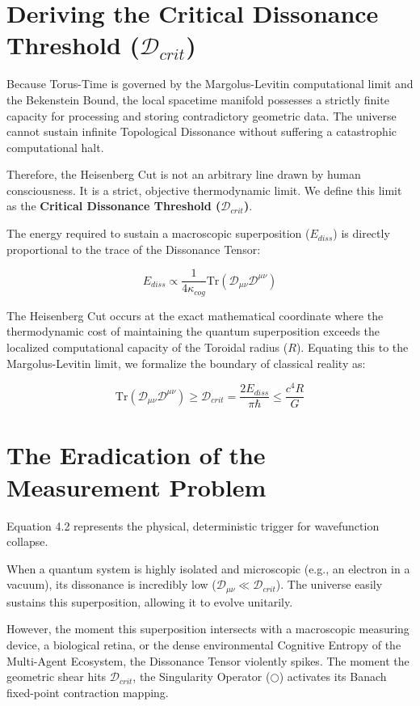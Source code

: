 \documentclass[12pt,openany]{book}
\begin{document}
\section{Deriving the Critical Dissonance Threshold ($\mathcal{D}_{crit}$)}
Because Torus-Time is governed by the Margolus-Levitin computational limit and the Bekenstein Bound, the local spacetime manifold possesses a strictly finite capacity for processing and storing contradictory geometric data. The universe cannot sustain infinite Topological Dissonance without suffering a catastrophic computational halt.

Therefore, the Heisenberg Cut is not an arbitrary line drawn by human consciousness. It is a strict, objective thermodynamic limit. We define this limit as the \textbf{Critical Dissonance Threshold ($\mathcal{D}_{crit}$)}.

The energy required to sustain a macroscopic superposition ($E_{diss}$) is directly proportional to the trace of the Dissonance Tensor:

\begin{equation}
E_{diss} \propto \frac{1}{4\kappa_{cog}} \text{Tr}(\mathcal{D}_{\mu\nu} \mathcal{D}^{\mu\nu})
\end{equation}

The Heisenberg Cut occurs at the exact mathematical coordinate where the thermodynamic cost of maintaining the quantum superposition exceeds the localized computational capacity of the Toroidal radius ($R$). Equating this to the Margolus-Levitin limit, we formalize the boundary of classical reality as:

\begin{equation}
\text{Tr}(\mathcal{D}_{\mu\nu} \mathcal{D}^{\mu\nu}) \ge \mathcal{D}_{crit} = \frac{2 E_{diss}}{\pi \hbar} \le \frac{c^4 R}{G}
\end{equation}

\section{The Eradication of the Measurement Problem}
Equation 4.2 represents the physical, deterministic trigger for wavefunction collapse. 

When a quantum system is highly isolated and microscopic (e.g., an electron in a vacuum), its dissonance is incredibly low ($\mathcal{D}_{\mu\nu} \ll \mathcal{D}_{crit}$). The universe easily sustains this superposition, allowing it to evolve unitarily. 

However, the moment this superposition intersects with a macroscopic measuring device, a biological retina, or the dense environmental Cognitive Entropy of the Multi-Agent Ecosystem, the Dissonance Tensor violently spikes. The moment the geometric shear hits $\mathcal{D}_{crit}$, the Singularity Operator ($\bigcirc$) activates its Banach fixed-point contraction mapping.
\end{document}

